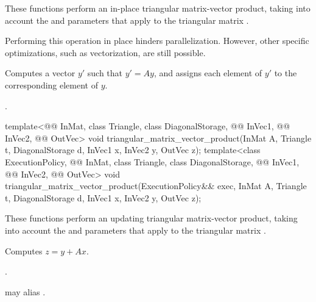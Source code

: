 \begin{itemdescr}

\pnum
These functions perform an in-place triangular matrix-vector product,
taking into account the  and  parameters
that apply to the triangular matrix .
\begin{note}
Performing this operation in place hinders parallelization.
However, other  specific optimizations,
such as vectorization, are still possible.
\end{note}

\pnum
\effects
Computes a vector $y'$ such that $y' = A y$,
and assigns each element of $y'$ to the corresponding element of $y$.

\pnum
\complexity
{}.
\end{itemdescr}

%
\begin{itemdecl}
template<@@ InMat, class Triangle, class DiagonalStorage,
         @@ InVec1, @@ InVec2, @@ OutVec>
  void triangular_matrix_vector_product(InMat A, Triangle t, DiagonalStorage d,
                                        InVec1 x, InVec2 y, OutVec z);
template<class ExecutionPolicy, @@ InMat, class Triangle, class DiagonalStorage,
         @@ InVec1, @@ InVec2, @@ OutVec>
  void triangular_matrix_vector_product(ExecutionPolicy&& exec,
                                        InMat A, Triangle t, DiagonalStorage d,
                                        InVec1 x, InVec2 y, OutVec z);
\end{itemdecl}

\begin{itemdescr}
\pnum
These functions perform an updating triangular matrix-vector product,
taking into account the  and  parameters
that apply to the triangular matrix .

\pnum
\effects
Computes $z = y + A x$.

\pnum
\complexity
{}.

\pnum
\remarks
{} may alias .
\end{itemdescr}

